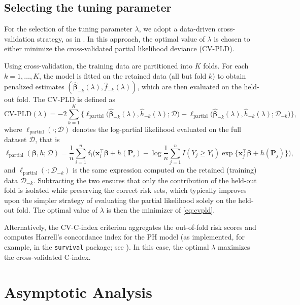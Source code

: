 \documentclass[11pt]{article}
\begin{document}
\subsection{Selecting the tuning parameter}\label{sec:selection}
For the selection of the tuning parameter $\lambda$, we adopt a data-driven cross-validation strategy, as in \cite{cygu2021pcoxtime}. 
In this approach, the optimal value of $\lambda$ is chosen to either minimize the cross-validated partial likelihood deviance (CV-PLD).  

Using cross-validation, the training data are partitioned into $K$ folds. For each $k=1,\dots,K$, the model is fitted on the retained data (all but fold $k$) to obtain penalized estimates 
$(\hat{\bm\beta}_{-k}(\lambda), \hat f_{-k}(\lambda))$, which are then evaluated on the held-out fold. 
The CV-PLD is defined as
\begin{equation}\label{eq:cvpld}
	\text{CV-PLD}(\lambda)
	= -2 \sum_{k=1}^{K} \Big\{
	\ell_{\text{partial}}\!\big(\hat{\bm\beta}_{-k}(\lambda), \hat h_{-k}(\lambda); \mathcal D\big)
	-
	\ell_{\text{partial}}\!\big(\hat{\bm\beta}_{-k}(\lambda), \hat h_{-k}(\lambda); \mathcal D_{-k}\big)
	\Big\},
\end{equation}
where $\ell_{\text{partial}}(\cdot;\mathcal D)$ denotes the log-partial likelihood evaluated on the full dataset $\mathcal D$, that is
\[
\ell_{\text{partial}}(\bm \beta, h; \mathcal D) 
= \frac{1}{n} \sum_{i=1}^n \delta_i \Bigg(\bm{x}_i^\top \bm{\beta} + h(\bm{P}_i) 
- \log \frac{1}{n} \sum_{j=1}^n I(Y_j \ge Y_i)\exp\{\bm{x}_j^\top \bm{\beta} + h(\bm{P}_j)\}\Bigg),
\]
and $\ell_{\text{partial}}(\cdot;\mathcal D_{-k})$ is the same expression computed on the retained (training) data $\mathcal D_{-k}$. 
Subtracting the two ensures that only the contribution of the held-out fold is isolated while preserving the correct risk sets, which typically improves upon the simpler strategy of evaluating the partial likelihood solely on the held-out fold. 
The optimal value of $\lambda$ is then the minimizer of \eqref{eq:cvpld}.  


Alternatively, the CV-C-index \citep{harrell1996multivariable} criterion aggregates the out-of-fold risk scores and computes Harrell’s concordance index for the PH model (as implemented, for example, in the \texttt{survival} package; see \citealp{dai2019cross}). 
In this case, the optimal $\lambda$ maximizes the cross-validated C-index.  


\section{Asymptotic Analysis}\label{sec:asymptotic}
\end{document}
